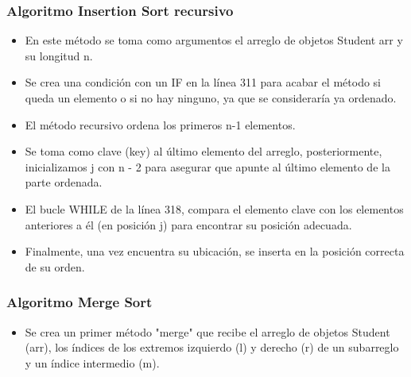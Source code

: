 \documentclass{article}
\begin{document}
        \subsubsection{Algoritmo Insertion Sort recursivo}

        

        \begin{itemize}	
            \item En este método se toma como argumentos el arreglo de objetos Student arr y su longitud n.
            \item Se crea una condición con un IF en la línea 311 para acabar el método si queda un elemento o si no hay ninguno, ya que se consideraría ya ordenado.
            \item El método recursivo ordena los primeros n-1 elementos. 
            \item Se toma como clave (key) al último elemento del arreglo, posteriormente, inicializamos j con n - 2 para asegurar que apunte al último elemento de la parte ordenada. 
            \item El bucle WHILE de la línea 318, compara el elemento clave con los elementos anteriores a él (en posición j) para encontrar su posición adecuada.
            \item Finalmente, una vez encuentra su ubicación, se inserta en la posición correcta de su orden.
        \end{itemize}

        \subsubsection{Algoritmo Merge Sort}

        \begin{itemize}
            \item Se crea un primer método "merge" que recibe el arreglo de objetos Student (arr), los índices de los extremos izquierdo (l) y derecho (r) de un subarreglo y un índice intermedio (m).

        \end{itemize}
        
        
        
\end{document}
